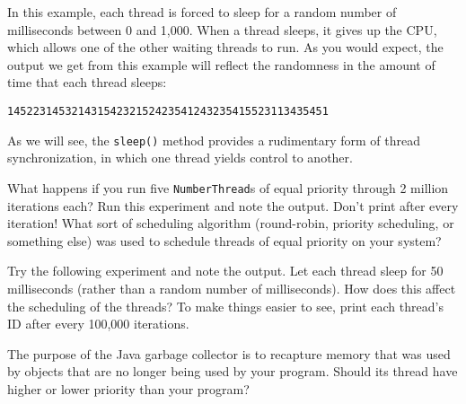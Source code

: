 \noindent In this example, each thread is forced to sleep for a random
number of milliseconds between 0 and 1,000. When a thread sleeps, it
gives up the CPU, which allows one of the other waiting threads to
run.  As you would expect, the output we get from this example will
reflect the randomness in the amount of time that each thread sleeps:

\begin{jjjlisting}
\begin{lstlisting}
14522314532143154232152423541243235415523113435451
\end{lstlisting}
\end{jjjlisting}

\noindent As we will see, the {\tt sleep()} method provides a
rudimentary form of thread synchronization, in which one thread
yields control to another.

\pagebreak
{}
\label{self-study-exercises}
\begin{SSTUDY}

\item  What happens if you run five {\tt NumberThread}s of equal priority
through 2 million iterations each? Run this experiment and note the
output.  Don't print after every iteration! What sort of scheduling
algorithm (round-robin, priority scheduling, or something else) was used
to schedule threads of equal priority on your system?

\item  Try the following experiment and note the output.   Let each thread
sleep for 50 milliseconds (rather than a random number of
milliseconds). How does this affect the scheduling of the threads? To
make things easier to see, print each thread's ID after every 100,000
iterations.

\item  The purpose of the Java garbage collector is to recapture
memory that was used by objects that are no longer being
used by your program.  Should its thread have higher or
lower priority than your program?
\end{SSTUDY}


